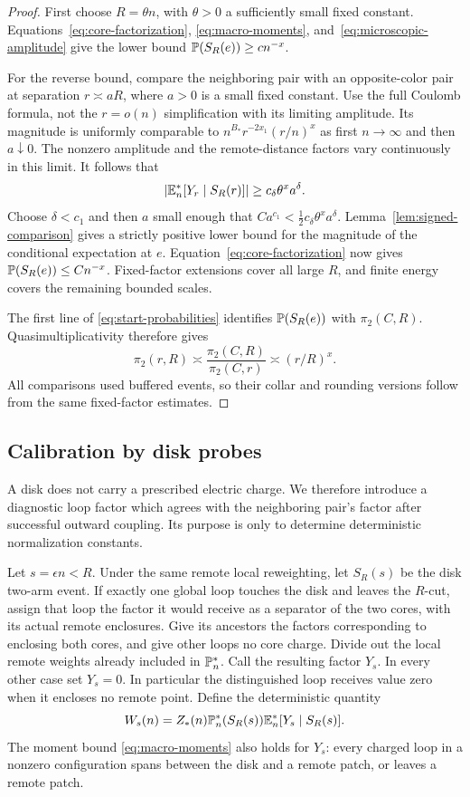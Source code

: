 \begin{proof}
First choose $R=\theta n$, with $\theta>0$ a sufficiently small fixed
constant. Equations~\eqref{eq:core-factorization},
\eqref{eq:macro-moments}, and~\eqref{eq:microscopic-amplitude}
give the lower bound $\mathbb P(S_R(e))\ge c n^{-x}$.

For the reverse bound, compare the neighboring pair with an
opposite-color pair at separation $r\asymp aR$, where $a>0$ is a
small fixed constant. Use the full Coulomb formula, not the
$r=o(n)$ simplification with its limiting amplitude. Its magnitude
is uniformly comparable to
$n^{B_*}r^{-2x_1}(r/n)^x$ as first $n\to\infty$ and then
$a\downarrow0$. The nonzero amplitude and the remote-distance
factors vary continuously in this limit. It follows that
\[
 \left|\mathbb E_n^*[Y_r\mid S_R(r)]\right|
 \ge c_\delta\theta^x a^\delta.
\]
Choose $\delta<c_1$ and then $a$ small enough that
$Ca^{c_1}<\tfrac12 c_\delta\theta^x a^\delta$.
Lemma~\ref{lem:signed-comparison} gives a strictly positive lower
bound for the magnitude of the conditional expectation at $e$.
Equation~\eqref{eq:core-factorization} now gives
$\mathbb P(S_R(e))\le C n^{-x}$. Fixed-factor extensions cover all large
$R$, and finite energy covers the remaining bounded scales.

The first line of \eqref{eq:start-probabilities} identifies
$\mathbb P(S_R(e))$ with $\pi_2(C,R)$. Quasimultiplicativity therefore gives
\[
 \pi_2(r,R)\asymp
 \frac{\pi_2(C,R)}{\pi_2(C,r)}\asymp(r/R)^x.
\]
All comparisons used buffered events, so their collar and rounding
versions follow from the same fixed-factor estimates.
\end{proof}

\subsection{Calibration by disk probes}

A disk does not carry a prescribed electric charge. We therefore
introduce a diagnostic loop factor which agrees with the neighboring
pair's factor after successful outward coupling. Its purpose is only
to determine deterministic normalization constants.

Let $s=\epsilon n<R$. Under the same remote local reweighting, let
$S_R(s)$ be the disk two-arm event. If exactly one global loop touches
the disk and leaves the $R$-cut, assign that loop the factor it would
receive as a separator of the two cores, with its actual remote
enclosures. Give its ancestors the factors corresponding to enclosing
both cores, and give other loops no core charge. Divide out the local
remote weights already included in $\mathbb P_n^*$. Call the resulting
factor $Y_s$. In every other case set $Y_s=0$. In particular the
distinguished loop receives value zero when it encloses no remote
point. Define the deterministic quantity
\begin{equation}\label{eq:disk-diagnostic}
 W_s(n)=Z_*(n)\mathbb P_n^*(S_R(s))
                       \mathbb E_n^*[Y_s\mid S_R(s)].
\end{equation}
The moment bound \eqref{eq:macro-moments} also holds for $Y_s$:
every charged loop in a nonzero configuration spans between the disk
and a remote patch, or leaves a remote patch.


